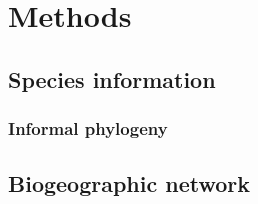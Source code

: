 \documentclass[12pt,letterpaper]{article}
\begin{document}
\section{Methods}

\subsection{Species information}

\subsubsection{Informal phylogeny}

\subsection{Biogeographic network}
\end{document}
